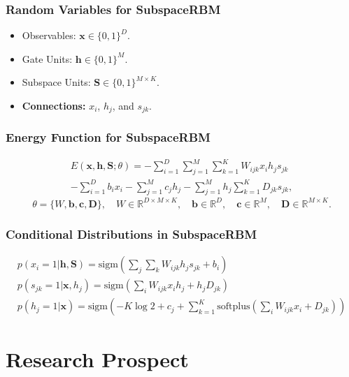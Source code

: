 \documentclass{antclass}
\begin{document}
\pagebreak
\subsection{Random Variables for SubspaceRBM}
\begin{itemize}
	\item Observables: \( \mathbf{x} \in \{0, 1\}^D \).
	\item Gate Units: \( \mathbf{h} \in \{0, 1\}^M \).
	\item Subspace Units: \( \mathbf{S} \in \{0, 1\}^{M \times K} \).
	\item \textbf{Connections:} \( x_i \), \( h_j \), and \( s_{jk} \).
\end{itemize}

\pagebreak

\subsection{Energy Function for SubspaceRBM}
	\begin{align}
	E(\mathbf{x}, \mathbf{h}, \mathbf{S}; \theta) =
	-\sum_{i=1}^D \sum_{j=1}^M \sum_{k=1}^K W_{ijk} x_i h_j s_{jk} \nonumber \\
	-\sum_{i=1}^D b_i x_i 
	-\sum_{j=1}^M c_j h_j 
	-\sum_{j=1}^M h_j \sum_{k=1}^K D_{jk} s_{jk},
	\end{align}
	\[
	\theta = \{W, \mathbf{b}, \mathbf{c}, \mathbf{D}\}, \quad 
	W \in \mathbb{R}^{D \times M \times K}, \quad \mathbf{b} \in \mathbb{R}^D, \quad \mathbf{c} \in \mathbb{R}^M, \quad \mathbf{D} \in \mathbb{R}^{M \times K}.
	\]
	
	
\pagebreak
\subsection{Conditional Distributions in SubspaceRBM}
\begin{gather}	
	p(x_i = 1 | \mathbf{h}, \mathbf{S}) = \mathrm{sigm}\left(\sum_j \sum_k W_{ijk} h_j s_{jk} + b_i\right) \\
	p(s_{jk} = 1 | \mathbf{x}, h_j) = \mathrm{sigm}\left(\sum_i W_{ijk} x_i h_j + h_j D_{jk}\right) \\
	p(h_j = 1 | \mathbf{x}) = \mathrm{sigm}\left(-K \log 2 + c_j + \sum_{k=1}^K \mathrm{softplus}\left(\sum_i W_{ijk} x_i + D_{jk}\right)\right)
\end{gather}



\chapter{Research Prospect}
\end{document}
